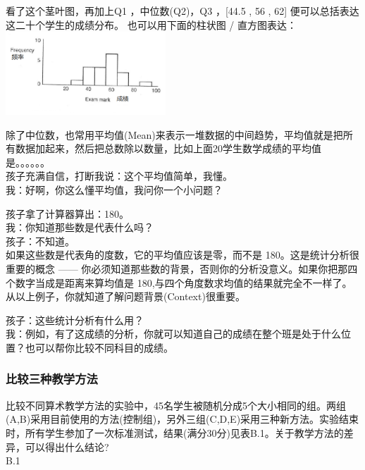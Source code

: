 看了这个茎叶图，再加上Q1 ，中位数(Q2)，Q3 ，{[}44.5 , 56 , 62{]}
便可以总括表达这二十个学生的成绩分布。 也可以用下面的柱状图 /
直方图表达：\\

\includegraphics[width=6cm]{MA_FA1_10.png}

除了中位数，也常用平均值(Mean)来表示一堆数据的中间趋势，平均值就是把所有数据加起来，然后把总数除以数量，比如上面20学生数学成绩的平均值是。。。。。。\\
孩子充满自信，打断我说：这个平均值简单，我懂。\\
我：好啊，你这么懂平均值，我问你一个小问题？\\


孩子拿了计算器算出：180。\\
我：你知道那些数是代表什么吗？\\
孩子：不知道。\\
如果这些数是代表角的度数，它的平均值应该是零，而不是
180。这是统计分析很重要的概念 ------
你必须知道那些数的背景，否则你的分析没意义。如果你把那四个数字当成是距离来算均值是
180,与四个角度数求均值的结果就完全不一样了。\\
从以上例子，你就知道了解问题背景(Context)很重要。

孩子：这些统计分析有什么用？\\
我：例如，有了这成绩的分析，你就可以知道自己的成绩在整个班是处于什么位置？也可以帮你比较不同科目的成绩。

\hypertarget{ux6bd4ux8f83ux4e09ux79cdux6559ux5b66ux65b9ux6cd5}{%
\subsubsection{比较三种教学方法}\label{ux6bd4ux8f83ux4e09ux79cdux6559ux5b66ux65b9ux6cd5}}

比较不同算术教学方法的实验中，45名学生被随机分成5个大小相同的组。两组(A,B)采用目前使用的方法(控制组)，另外三组(C,D,E)采用三种新方法。实验结束时，所有学生参加了一次标准测试，结果(满分30分)见表B.1。关于教学方法的差异，可以得出什么结论?\\
B.1

